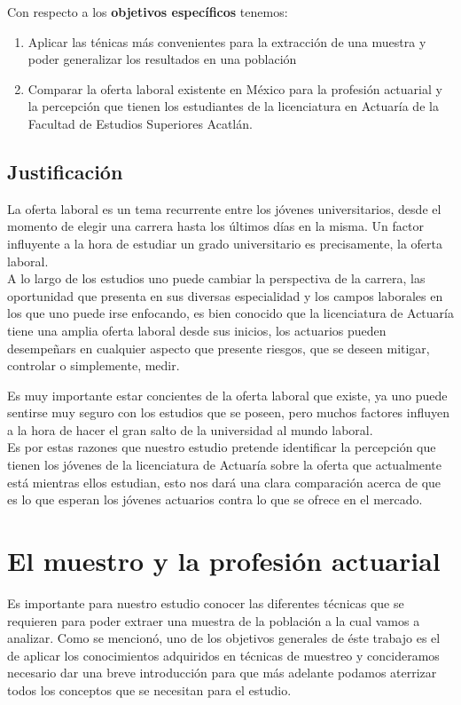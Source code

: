 \documentclass[a4paper]{article}
\begin{document}
Con respecto a los \textbf{objetivos específicos} tenemos:

\begin{enumerate}
	\item Aplicar las ténicas más convenientes para la extracción de una muestra y poder generalizar los resultados en una población
	\item Comparar la oferta laboral existente en México para la profesión actuarial y la percepción que tienen los estudiantes de la licenciatura en Actuaría de la Facultad de Estudios Superiores Acatlán.
\end{enumerate}

\subsection{Justificación}
La oferta laboral es un tema recurrente entre los jóvenes universitarios, desde el momento de elegir una carrera hasta los últimos días en la misma. Un factor influyente a la hora de estudiar un grado universitario es precisamente, la oferta laboral.\\

A lo largo de los estudios uno puede cambiar la perspectiva de la carrera, las oportunidad que presenta en sus diversas especialidad y los campos laborales en los que uno puede irse enfocando, es bien conocido que la licenciatura de Actuaría tiene una amplia oferta laboral desde sus inicios, los actuarios pueden desempeñars en cualquier aspecto que presente riesgos, que se deseen mitigar, controlar o simplemente, medir.

Es muy importante estar concientes de la oferta laboral que existe, ya uno puede sentirse muy seguro con los estudios que se poseen, pero muchos factores influyen a la hora de hacer el gran salto de la universidad al mundo laboral.\\

Es por estas razones que nuestro estudio pretende identificar la percepción que tienen los jóvenes de la licenciatura de Actuaría sobre la oferta que actualmente está mientras ellos estudian, esto nos dará una clara comparación acerca de que es lo que esperan los jóvenes actuarios contra lo que se ofrece en el mercado.
 
\section{El muestro y la profesión actuarial}
Es importante para nuestro estudio conocer las diferentes técnicas que se requieren para poder extraer una muestra de la población a la cual vamos a analizar. Como se mencionó, uno de los objetivos generales de éste trabajo es el de aplicar los conocimientos adquiridos en técnicas de muestreo y concideramos necesario dar una breve introducción para que más adelante podamos aterrizar todos los conceptos que se necesitan para el estudio.\\
\end{document}
